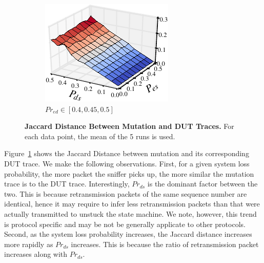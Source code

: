 \begin{figure}[t!]
\begin{subfigure}{0.33\textwidth}
  \end{subfigure}\hspace*{0.01\textwidth}
  \begin{subfigure}{0.33\textwidth}
    \centering
    \includegraphics[width=\textwidth]{./figures/scripts/MutationDUTJaccard3DFigure_0_50.pdf}
    \caption{$Pr_{ed} \in [0.4, 0.45, 0.5]$}
  \end{subfigure}\hspace*{0.01\textwidth}
  \caption{\textbf{Jaccard Distance Between Mutation and DUT Traces.} For each
  data point, the mean of the 5 runs is used.}
  \label{fig:mutation_dut}
\end{figure}


Figure~\ref{fig:mutation_dut} shows the Jaccard Distance between mutation and
its corresponding DUT trace.
%
We make the following observations.
%
First, for a given system loss probability, the more packet the sniffer picks up,
the more similar the mutation trace is to the DUT trace.
%
Interestingly, $Pr_{ds}$ is the dominant factor between the two.
%
This is because retransmission packets of the same sequence number are
identical, hence it may require to infer less retransmission packets than that
were actually transmitted to unstuck the state machine.
%
We note, however, this
trend is protocol specific and may be not be generally applicate to other
protocols.
%
Second, as the system loss probability increases, the Jaccard distance increases
more rapidly as $Pr_{ds}$ increases.
%
This is because the ratio of retransmission
packet increases along with $Pr_{ds}$.


